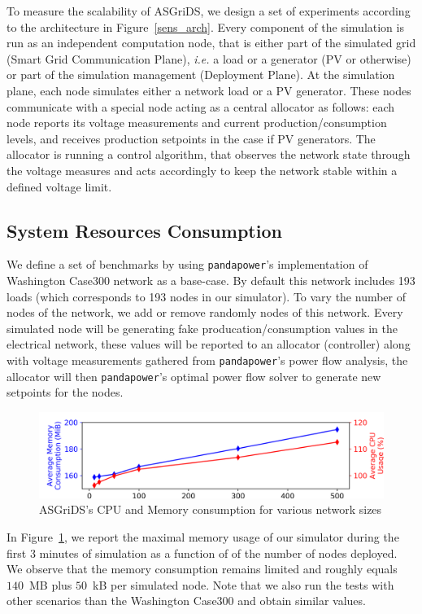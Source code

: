 \documentclass[conference]{IEEEtran}
\begin{document}
To measure the scalability of ASGriDS, we design a set of experiments according to the architecture in Figure~\ref{sens_arch}. Every component of the simulation is run as an independent computation node, that is either part of the simulated grid (Smart Grid Communication Plane), \emph{i.e.} a load or a generator (PV or otherwise) or part of the simulation management (Deployment Plane). At the simulation plane, each node simulates either a network load or a PV generator. These nodes communicate with a special node acting as a central allocator as follows: each node reports its voltage measurements and current production/consumption levels, and receives production setpoints in the case if PV generators. The allocator is running a control algorithm, that observes the network state through the voltage measures and acts accordingly to keep the network stable within a defined voltage limit.

\subsection{System Resources Consumption}

We define a set of benchmarks by using \texttt{pandapower}'s implementation of Washington Case300 network as a base-case. By default this network includes 193 loads (which corresponds to 193 nodes in our simulator). To vary the number of nodes of the network, we add or remove randomly nodes of this network. Every simulated node will be generating fake producation/consumption values in the electrical network, these values will be reported to an allocator (controller) along with voltage measurements gathered from \texttt{pandapower}'s power flow analysis, the allocator will then \texttt{pandapower}'s optimal power flow solver to generate new setpoints for the nodes. 

\begin{figure}[htp]
	\centering%
	\includegraphics[width=1\linewidth]{mem_cpu.png}%
	\caption{ASGriDS's CPU and Memory consumption for various network sizes}%
	\label{sim_mem}
\end{figure}

In Figure~\ref{sim_mem}, we report the maximal memory usage of our simulator during the first 3 minutes of simulation as a function of of the number of nodes deployed.  We observe that the memory consumption remains limited and roughly equals $140$~MB plus $50$~kB per simulated node. Note that we also run the tests with other scenarios than the Washington Case300 and obtain similar values. 
\end{document}
